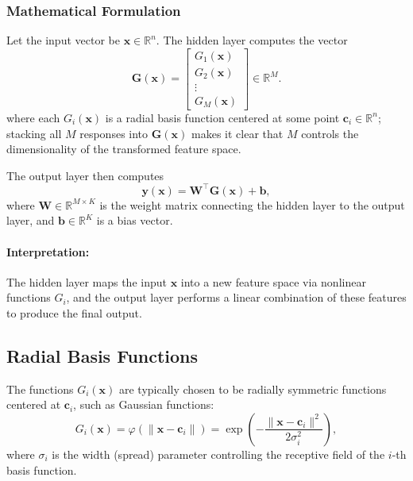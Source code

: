 \subsubsection{Mathematical Formulation}
\label{sec:rbf_mathematical_formulation_sub}

Let the input vector be \(\mathbf{x} \in \mathbb{R}^n\). The hidden layer computes the vector
\[
\mathbf{G}(\mathbf{x}) = \begin{bmatrix}
G_1(\mathbf{x}) \\
G_2(\mathbf{x}) \\
\vdots \\
G_M(\mathbf{x})
\end{bmatrix} \in \mathbb{R}^M.
\]
where each \(G_i(\mathbf{x})\) is a radial basis function centered at some point \(\mathbf{c}_i \in \mathbb{R}^n\); stacking all \(M\) responses into \(\mathbf{G}(\mathbf{x})\) makes it clear that \(M\) controls the dimensionality of the transformed feature space.

The output layer then computes
\begin{equation}
\mathbf{y}(\mathbf{x}) = \mathbf{W}^\top \mathbf{G}(\mathbf{x}) + \mathbf{b}, \label{eq:rbfn_output}
\end{equation}
where \(\mathbf{W} \in \mathbb{R}^{M \times K}\) is the weight matrix connecting the hidden layer to the output layer, and \(\mathbf{b} \in \mathbb{R}^K\) is a bias vector.

\paragraph{Interpretation:} The hidden layer maps the input \(\mathbf{x}\) into a new feature space via nonlinear functions \(G_i\), and the output layer performs a linear combination of these features to produce the final output.

\subsection{Radial Basis Functions}
\label{sec:rbf_radial_basis_functions}

The functions \(G_i(\mathbf{x})\) are typically chosen to be radially symmetric functions centered at \(\mathbf{c}_i\), such as Gaussian functions:
\begin{equation}
G_i(\mathbf{x}) = \varphi\left(\|\mathbf{x} - \mathbf{c}_i\|\right) = \exp\left(-\frac{\|\mathbf{x} - \mathbf{c}_i\|^2}{2\sigma_i^2}\right), \label{eq:gaussian_rbf}
\end{equation}
where \(\sigma_i\) is the width (spread) parameter controlling the receptive field of the \(i\)-th basis function.

